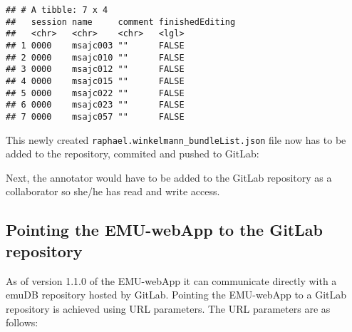 \documentclass[
]{book}
\newenvironment{Shaded}{\begin{snugshade}}{\end{snugshade}}
\newcommand{\AttributeTok}[1]{\textcolor[rgb]{0.77,0.63,0.00}{#1}}
\newcommand{\CommentTok}[1]{\textcolor[rgb]{0.56,0.35,0.01}{\textit{#1}}}
\newcommand{\FunctionTok}[1]{\textcolor[rgb]{0.00,0.00,0.00}{#1}}
\newcommand{\NormalTok}[1]{#1}
\newcommand{\SpecialCharTok}[1]{\textcolor[rgb]{0.00,0.00,0.00}{#1}}
\newcommand{\StringTok}[1]{\textcolor[rgb]{0.31,0.60,0.02}{#1}}
\begin{document}
\begin{verbatim}
## # A tibble: 7 x 4
##   session name     comment finishedEditing
##   <chr>   <chr>    <chr>   <lgl>          
## 1 0000    msajc003 ""      FALSE          
## 2 0000    msajc010 ""      FALSE          
## 3 0000    msajc012 ""      FALSE          
## 4 0000    msajc015 ""      FALSE          
## 5 0000    msajc022 ""      FALSE          
## 6 0000    msajc023 ""      FALSE          
## 7 0000    msajc057 ""      FALSE
\end{verbatim}

This newly created \texttt{raphael.winkelmann\_bundleList.json} file now has to be added to the repository, commited and pushed to GitLab:

\begin{Shaded}
\end{Shaded}

Next, the annotator would have to be added to the GitLab repository as a collaborator so she/he has read and write access.

\hypertarget{pointing-the-emu-webapp-to-the-gitlab-repository}{%
\subsection{Pointing the EMU-webApp to the GitLab repository}\label{pointing-the-emu-webapp-to-the-gitlab-repository}}

As of version 1.1.0 of the EMU-webApp it can communicate directly with a emuDB repository hosted by GitLab. Pointing the EMU-webApp to a GitLab repository is achieved using URL parameters. The URL parameters are as follows:
\end{document}
